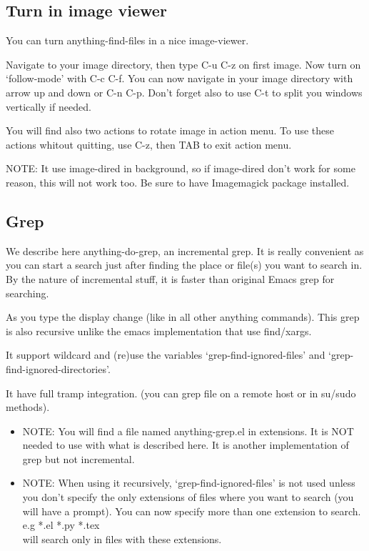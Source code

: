 \documentclass[a4paper,11pt]{article}
\begin{document}
\subsection{Turn in image viewer}
\label{sec:turn-image-viewer}
You can turn anything-find-files in a nice image-viewer.

Navigate to your image directory, then type C-u C-z on first image.
Now turn on `follow-mode' with C-c C-f.
You can now navigate in your image directory with arrow up and down or C-n C-p.
Don't forget also to use C-t to split you windows vertically if needed.

You will find also two actions to rotate image in action menu. 
To use these actions whitout quitting, use C-z, then TAB to exit action menu.

NOTE:
It use image-dired in background, so if image-dired don't work for some reason, this will
not work too.
Be sure to have Imagemagick package installed.

\subsection{Grep}
\label{sec:grep}
We describe here anything-do-grep, an incremental grep.
It is really convenient as you can start a search just after finding the place or file(s) you want to search in.
By the nature of incremental stuff, it is faster than original Emacs grep for searching.

As you type the display change (like in all other anything commands).
This grep is also recursive unlike the emacs implementation that use find/xargs.

It support wildcard and (re)use the variables `grep-find-ignored-files'
and `grep-find-ignored-directories'.

It have full tramp integration.
(you can grep file on a remote host or in su/sudo methods).


\begin{itemize}
\item NOTE: 
You will find a file named anything-grep.el in extensions.
It is NOT needed to use with what is described here.
It is another implementation of grep but not incremental.
\end{itemize}


\begin{itemize}
\item NOTE:
When using it recursively, `grep-find-ignored-files' is not used unless you don't specify
the only extensions of files where you want to search (you will have a prompt).
You can now specify more than one extension to search.\\
e.g *.el *.py *.tex \\
will search only in files with these extensions.
\end{itemize}
\end{document}

